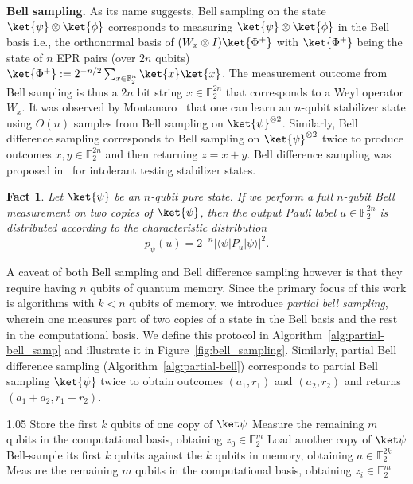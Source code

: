 \documentclass[11pt]{article}
\newtheorem{fact}[theorem]{Fact}
\newcommand{\FF}{\mathbb{F}}
\newcommand{\braketbra}[3]{\langle #1|#2| #3 \rangle}
\newcommand{\F}{\mathbb{F}}
\begin{document}
\textbf{Bell sampling.}  As its name suggests, Bell sampling on the state $\ket{\psi} \otimes \ket{\phi}$ corresponds to measuring $\ket{\psi} \otimes \ket{\phi}$ in the Bell basis i.e., the orthonormal basis of $(W_x \otimes I) \ket{\Phi^{+}}$ with $\ket{\Phi^+}$ being the state of $n$ EPR pairs (over $2n$ qubits) $\ket{\Phi^+} := 2^{-n/2} \sum_{x \in \FF_2^n} \ket{x}\ket{x}$. The measurement outcome from Bell sampling is thus a $2n$ bit string $x \in \FF_2^{2n}$ that corresponds to a Weyl operator $W_x$. It was observed by Montanaro~\cite{montanaro2017learning} that one can learn an $n$-qubit stabilizer state using $O(n)$ samples from Bell sampling on $\ket{\psi}^{\otimes 2}$. Similarly, Bell difference sampling corresponds to Bell sampling on $\ket{\psi}^{\otimes 2}$ twice to produce outcomes $x,y \in \FF_2^{2n}$ and then returning $z = x + y$. Bell difference sampling was proposed in~\cite{gross2021schur} for intolerant testing stabilizer states. 

\begin{fact}
\label{fact:bell-sampling}
Let $\ket{\psi}$ be an $n$-qubit pure state.  If we perform a full
$n$-qubit Bell measurement on two copies of $\ket{\psi}$, then the output
Pauli label $u\in\mathbb F_2^{2n}$ is distributed according to the characteristic distribution
$$
    p_\psi(u)
    =
    2^{-n}\left|\braketbra{\psi}{P_u}{\psi}\right|^2 .
$$
\end{fact}

A caveat of both Bell sampling and Bell difference sampling however is that they require having $n$ qubits of quantum memory. Since the primary focus of this work is algorithms with $k<n$ qubits of memory, we introduce \emph{partial bell sampling}, wherein one measures part of two copies of a state in the Bell basis and the rest in the computational basis. We define this protocol in Algorithm~\ref{alg:partial-bell_samp} and illustrate it in Figure~\ref{fig:bell_sampling}. Similarly, partial Bell difference sampling (Algorithm~\ref{alg:partial-bell}) corresponds to partial Bell sampling $\ket{\psi}$ twice to obtain outcomes $(a_1,r_1)$ and $(a_2,r_2)$ and returns $(a_1+a_2, r_1+r_2)$.

\begin{algorithm}[h]
\caption{Partial Bell sampling using $k$ qubits of memory}
\label{alg:partial-bell_samp}
\begin{spacing}{1.05}
\KwOutput{$(a,r)$ with $a\in\F_2^{2k}$ and $r\in\F_2^m$.}
Store the first $k$ qubits of one copy of $\ket\psi$\;
Measure the remaining $m$ qubits in the computational basis, obtaining
$z_{0}\in\F_2^m$\;
Load another copy of $\ket\psi$\;
Bell-sample its first $k$ qubits against the $k$ qubits in memory,
obtaining $a\in\F_2^{2k}$\;
Measure the remaining $m$ qubits in the computational basis, obtaining
$z_{i}\in\F_2^m$\;
\;
\end{spacing}
\end{algorithm}
\end{document}
